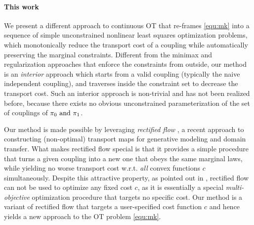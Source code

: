\paragraph{This work} 
We present a different approach to 
continuous OT  
that re-frames \eqref{equ:mk} into 
a sequence of simple unconstrained nonlinear least squares optimization problems, 
which 
monotonically reduce the transport cost of a coupling 
while automatically preserving the marginal constraints. 
Different from the 
minimax and regularization approaches that enforce the constraints from outside,  
our method is an \emph{interior} approach 
 which starts from a valid coupling (typically the naive independent coupling), and traverses inside the constraint set to decrease the transport cost.  
Such an interior approach is non-trivial and has not been realized before, because there exists no obvious unconstrained parameterization of the set of couplings of $\text{${\pi}_0$ and ${\pi}_1$}$. %

Our method is made possible by leveraging 
\emph{rectified flow} \cite{rectified}, 
a recent approach to constructing (non-optimal) transport maps for generative modeling and domain transfer.
What makes rectified flow special 
is that it provides a simple procedure
that turns a given coupling into a new one that 
obeys the same marginal laws, while yielding no worse transport cost w.r.t. \emph{all} convex functions $c$ simultaneously.  
Despite this attractive property, 
as pointed out in \cite{rectified}, 
rectified flow can not be used to optimize any fixed cost $c$, 
as it is essentially a special \emph{multi-objective} optimization procedure that targets no specific cost.  
Our method is a variant of rectified flow that targets a user-specified cost function $c$ and hence yields a new approach to the OT problem \eqref{equ:mk}. 

